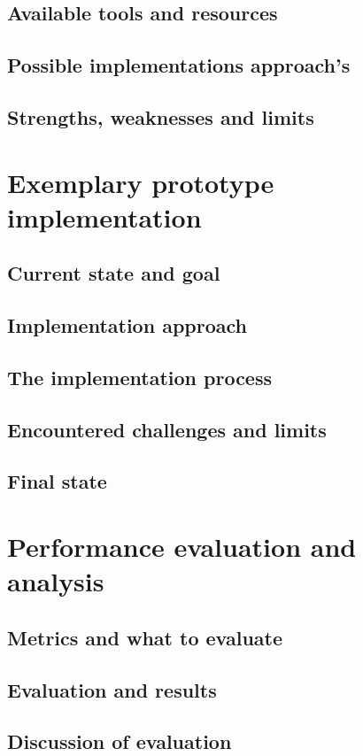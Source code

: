 \documentclass[12pt, a4paper]{article}
\begin{document}
    \subsection{Available tools and resources}
    \subsection{Possible implementations approach's}
    \subsection{Strengths, weaknesses and limits}

\section{Exemplary prototype implementation}\label{sec::solution_code}
    \subsection{Current state and goal}
    \subsection{Implementation approach}
    \subsection{The implementation process}
    \subsection{Encountered challenges and limits}
    \subsection{Final state}

\section{Performance evaluation and analysis}\label{sec::eval}
    \subsection{Metrics and what to evaluate}
    \subsection{Evaluation and results}
    \subsection{Discussion of evaluation}
\end{document}
